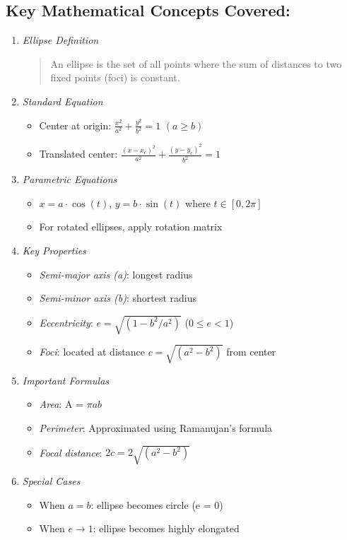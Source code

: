 \documentclass[a4paper,14pt]{article}
\begin{document}
\subsection{ Key Mathematical Concepts Covered:}
\begin{enumerate}
\item \emph{Ellipse Definition}
\begin{quote}
An ellipse is the set of all points where the sum of distances to two fixed points (foci) is constant.                                                                                                      \end{quote}
\item \emph{Standard Equation}
\begin{itemize}
\item Center at origin: \(\frac{x^2}{a^2} + \frac{y^2}{b^2} = 1\) \((a \geq b)\)
\item Translated center: \(\frac{(x-x_c)^2}{a^2} + \frac{(y-y_c)^2}{b^2} = 1\)
\end{itemize}
\item \emph{Parametric Equations}
\begin{itemize}
\item \(x = a\cdot\cos(t)\), \(y = b\cdot\sin(t)\) where \(t \in [0, 2\pi]\)
\item  For rotated ellipses, apply rotation matrix
\end{itemize}

\item \emph{Key Properties}
\begin{itemize}
\item \emph{Semi-major axis (a)}: longest radius
\item \emph{Semi-minor axis (b)}: shortest radius
\item \emph{Eccentricity}: \(e = \sqrt{(1 - b^2/a^2)}\) (\(0 \leq e < 1\))
\item \emph{Foci}: located at distance \(c = \sqrt{(a^2 - b^2)}\) from center
\end{itemize}

\item \emph{Important Formulas}
\begin{itemize}
\item \emph{Area}: A = \(\pi a b\)
\item \emph{Perimeter}: Approximated using Ramanujan's formula
\item \emph{Focal distance}: \( 2c = 2\sqrt{(a^2 - b^2)}\)
\end{itemize}
\item \emph{Special Cases}
\begin{itemize}
\item When \(a = b\): ellipse becomes circle (e = 0)
\item When \(e \rightarrow 1\): ellipse becomes highly elongated
\end{itemize}
\end{enumerate}
\end{document}
